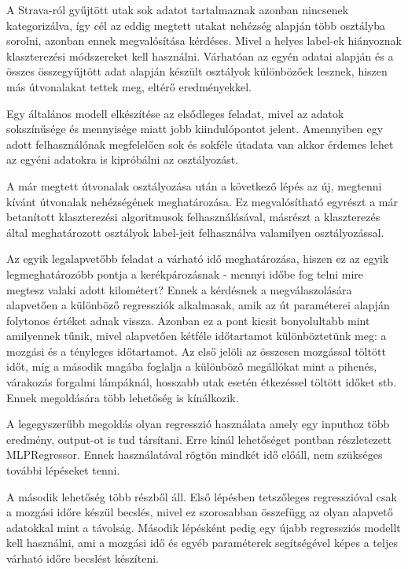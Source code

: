 A Strava-ról gyűjtött utak sok adatot tartalmaznak azonban nincsenek kategorizálva, így cél az eddig megtett utakat nehézség alapján több osztályba sorolni, azonban ennek megvalósítása kérdéses. Mivel a helyes label-ek hiányoznak klaszterezési módszereket kell használni. Várhatóan az egyén adatai alapján és a összes összegyűjtött adat alapján készült osztályok különbözőek lesznek, hiszen más útvonalakat tettek meg, eltérő eredményekkel.

Egy általános modell elkészítése az elsődleges feladat, mivel az adatok sokszínűsége és mennyisége miatt jobb kiindulópontot jelent. Amennyiben egy adott felhasználónak megfelelően sok és sokféle útadata van akkor érdemes lehet az egyéni adatokra is kipróbálni az osztályozást.

A már megtett útvonalak osztályozása után a következő lépés az új, megtenni kívánt útvonalak nehézségének meghatározása. Ez megvalósítható egyrészt a már betanított klaszterezési algoritmusok felhasználásával, másrészt a klaszterezés által meghatározott osztályok label-jeit felhasználva valamilyen osztályozással. 



Az egyik legalapvetőbb feladat a várható idő meghatározása, hiszen ez az egyik legmeghatározóbb pontja a kerékpározásnak - mennyi időbe fog telni mire megtesz valaki adott kilométert? Ennek a kérdésnek a megválaszolására alapvetően a különböző regressziók alkalmasak, amik az út paraméterei alapján folytonos értéket adnak vissza. Azonban ez a pont kicsit bonyolultabb mint amilyennek tűnik, mivel alapvetően kétféle időtartamot különböztetünk meg: a mozgási és a tényleges időtartamot. Az első jelöli az összesen mozgással töltött időt, míg a második magába foglalja a különböző megállókat mint a pihenés, várakozás forgalmi lámpáknál, hosszabb utak esetén étkezéssel töltött időket stb. Ennek megoldására több lehetőség is kínálkozik.

A legegyszerűbb megoldás olyan regresszió használata amely egy inputhoz több eredmény, output-ot is tud társítani. Erre kínál lehetőséget  pontban részletezett MLPRegressor. Ennek használatával rögtön mindkét idő előáll, nem szükséges további lépéseket tenni.

A második lehetőség több részből áll. Első lépésben tetszőleges regresszióval csak a mozgási időre készül becslés, mivel ez szorosabban összefügg  az olyan alapvető adatokkal mint a távolság. Második lépésként pedig egy újabb regressziós modellt kell használni, ami a mozgási idő és egyéb paraméterek segítségével képes a teljes várható időre becslést készíteni.


